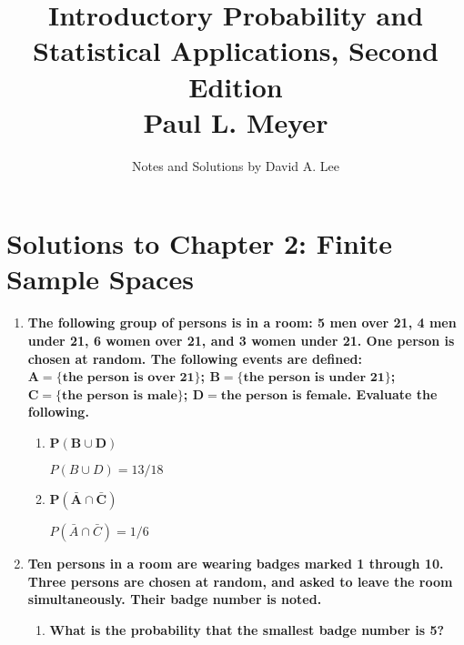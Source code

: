 \documentclass[10pt, oneside]{article}   	%
\title{Introductory Probability and Statistical Applications, Second Edition \\
\large{Paul L. Meyer}}
\author{Notes and Solutions by David A. Lee}
\date{}							%
\theoremstyle{definition}
\begin{document}
\maketitle
\section*{Solutions to Chapter 2: Finite Sample Spaces}

\begin{enumerate}[label=2.\arabic*]
\itemsep0em 
\item  \begin{tcolorbox}[
  colback=Cerulean!5!white,
  colframe=Cerulean!75!black]
\textbf{The following group of persons is in a room: 5 men over 21, 4 men under 21, 6 women over 21, and 3 women under 21. One person is chosen at random. The following events are defined: $\bm{A = \{\text{the person is over 21} \}}$; $\bm{B = \{ \text{the person is under 21} \}}$; $\bm{C = \{ \text{the person is male} \}}$; $\bm{D = \text{the person is female}}$. Evaluate the following.}
\end{tcolorbox}

	\begin{enumerate}
	\item \begin{tcolorbox}[
  colback=Cerulean!5!white,
  colframe=Cerulean!75!black]
  $\bm{P(B \cup D)}$
  \end{tcolorbox}
	
	$P(B \cup D) = \boxed{13/18}$
	
	\item \begin{tcolorbox}[
  colback=Cerulean!5!white,
  colframe=Cerulean!75!black]
	$\bm{P(\bar{A} \cap \bar{C})}$
	\end{tcolorbox}
	
	$P(\bar{A} \cap \bar{C}) = \boxed{1/6}$
	
	\end{enumerate}
	
\item \begin{tcolorbox}[
  colback=Cerulean!5!white,
  colframe=Cerulean!75!black]
\textbf{Ten persons in a room are wearing badges marked 1 through 10. Three persons are chosen at random, and asked to leave the room simultaneously. Their badge number is noted.}
\end{tcolorbox}

	\begin{enumerate}
	\item  \begin{tcolorbox}[
  colback=Cerulean!5!white,
  colframe=Cerulean!75!black]
	\textbf{What is the probability that the smallest badge number is 5?}
	\end{tcolorbox}
	

\end{enumerate}
\end{enumerate}
\end{document}
